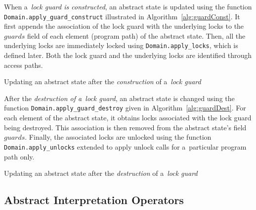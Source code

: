 When a~\emph{lock guard is constructed}, an abstract state is updated using the function \texttt{Domain.apply\_guard\_construct} illustrated in Algorithm~\ref{alg:guardConst}. It first appends the association of the lock guard with the underlying locks to the $ guards $ field of each element (program path) of the abstract state. Then, all the underlying locks are immediately locked using \texttt{Domain.apply\_locks}, which is defined later. Both the lock guard and the underlying locks are identified through access paths.

\begin{algorithm}[hbt]
%
%
    \caption{Updating an abstract state after the \emph{construction} of a~\emph{lock guard}}
    \label{alg:guardConst}
\end{algorithm}

After the \emph{destruction of a~lock guard}, an abstract state is changed using the function \texttt{Domain.apply\_guard\_destroy} given in Algorithm~\ref{alg:guardDest}. For each element of the abstract state, it obtains locks associated with the lock guard being destroyed. This association is then removed from the abstract state's field $ guards $. Finally, the associated locks are unlocked using the function \texttt{Domain.apply\_unlocks} extended to apply unlock calls for a~particular program path only.

\begin{algorithm}[hbt]
%
%
    \caption{Updating an abstract state after the \emph{destruction} of a~\emph{lock guard}}
    \label{alg:guardDest}
\end{algorithm}

\subsection{Abstract Interpretation Operators}

